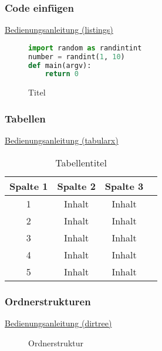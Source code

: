 \documentclass[a4paper, 11pt]{article}
\begin{document}
\subsubsection{Code einfügen}

\href{https://texdoc.org/serve/listings.pdf/0}{Bedienungsanleitung (listings)}

\begin{figure}[!ht]
\begin{lstlisting}[language=Python]
import random as randintint 
number = randint(1, 10)
def main(argv):
    return 0
\end{lstlisting}
\caption[Titel in Abbildungsverzeichnis (Code)]{Titel\footnotemark}
\label{fig:ExampleCode}
\end{figure}
\newpage

\subsubsection{Tabellen}

\href{https://texdoc.org/serve/tabularx/0}{Bedienungsanleitung (tabularx)}

\begin{table}[!ht]
\begin{tabular}{||c c c c||}
\hline
Spalte 1 & Spalte 2 & Spalte 3 \\ [0.5ex]
\hline\hline
1 & Inhalt & Inhalt \\
2 & Inhalt & Inhalt \\
3 & Inhalt & Inhalt \\
4 & Inhalt & Inhalt \\
5 & Inhalt & Inhalt \\ [1ex]
\hline
\end{tabular}
\caption[Tabellenname im Tabellenverzeichnis]{Tabellentitel\footnotemark}
\label{table:ExampleTable}
\end{table}
\newpage

\subsubsection{Ordnerstrukturen}

\href{https://de.mirrors.cicku.me/ctan/macros/generic/dirtree/dirtree.pdf}{Bedienungsanleitung (dirtree)}

\par\medskip
\begin{figure}[!ht]
\caption[Ordnerstruktur im Abbildungsverzeichnis]{Ordnerstruktur}
\label{fig:JSONStruct}
\end{figure}
\newpage
\end{document}
